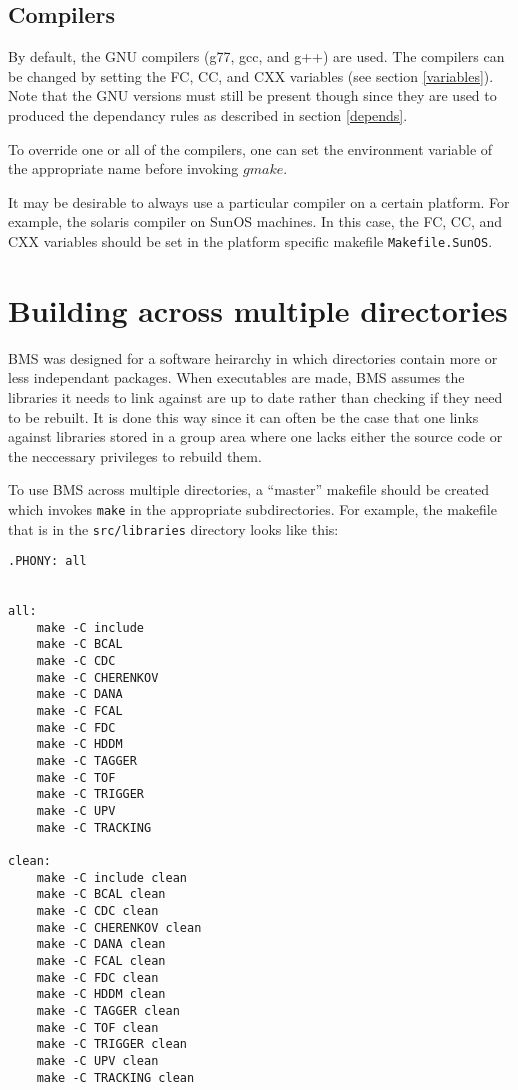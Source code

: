 \documentclass[12pt]{article}
\begin{document}
\subsection{Compilers}
By default, the GNU compilers (g77, gcc, and g++) are used. The
compilers can be changed by setting the FC, CC, and CXX variables
(see section \ref{variables}). Note that the GNU versions must still
be present though since they are used to produced the dependancy 
rules as described in section \ref{depends}.

To override one or all of the compilers, one can set the environment
variable of the appropriate name before invoking $gmake$.

It may be desirable to always use a particular compiler on a 
certain platform. For example, the solaris compiler on SunOS
machines. In this case, the FC, CC, and CXX variables should be
set in the platform specific makefile {\lstinline !Makefile.SunOS!}.

\section{Building across multiple directories}
\label{multiple}
BMS was designed for a software heirarchy in which directories contain
more or less independant packages. When executables are made,
BMS assumes the libraries it needs to link against are up to date
rather than checking
if they need to be rebuilt. It is done this way since it can
often be the case that one links against libraries stored in a
group area where one lacks either the source code or the
neccessary privileges to rebuild them.

To use BMS across multiple directories, a ``master'' makefile
should be created which invokes {\lstinline !make!} in the
appropriate subdirectories. For example, the makefile that is
in the {\lstinline !src/libraries!} directory looks like this:

\begin{lstlisting}[caption={Makefile from src/libraries},label=mastermakefile
,frame=shadowbox,backgroundcolor=\color{codebkgd}]
.PHONY: all


all:
	make -C include
	make -C BCAL
	make -C CDC
	make -C CHERENKOV
	make -C DANA
	make -C FCAL
	make -C FDC
	make -C HDDM
	make -C TAGGER
	make -C TOF
	make -C TRIGGER
	make -C UPV
	make -C TRACKING

clean:
	make -C include clean
	make -C BCAL clean
	make -C CDC clean
	make -C CHERENKOV clean
	make -C DANA clean
	make -C FCAL clean
	make -C FDC clean
	make -C HDDM clean
	make -C TAGGER clean
	make -C TOF clean
	make -C TRIGGER clean
	make -C UPV clean
	make -C TRACKING clean
\end{lstlisting}
\end{document}
